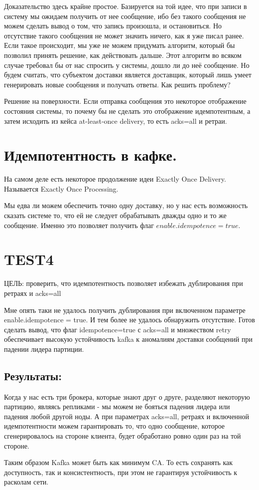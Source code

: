 \documentclass[11pt]{article}
\begin{document}
    Доказательство здесь крайне простое. Базируется на той идее, что при записи в систему мы ожидаем получить от нее сообщение, ибо без такого сообщения не можем сделать вывод о том, что запись произошла, и остановиться. Но отсутствие такого сообщения не может значить ничего, как я уже писал ранее.
    Если такое происходит, мы уже не можем придумать алгоритм, который бы позволил принять решение, как действовать дальше. Этот алгоритм во всяком случае требовал бы от нас спросить у системы, дошло ли до неё сообщение. Но будем считать, что субъектом доставки является доставщик, который лишь умеет генерировать новые сообщения и получать ответы. Как решить проблему?

    Решение на поверхности. Если отправка сообщения это некоторое отображение состояния системы, то почему бы не сделать это отображение идемпотентным, а затем исходить из кейса at-least-once delivery, то есть acks=all и ретраи.

    \section{Идемпотентность в кафке.}
    На самом деле есть некоторое продолжение идеи Exactly Once Delivery. Называется Exactly Once Processing.

    Мы едва ли можем обеспечить точно одну доставку, но у нас есть возможность сказать системе то, что ей не следует обрабатывать дважды одно и то же сообщение. Именно это позволяет получить флаг $enable.idempotence = true$.
    \section{TEST4}
    ЦЕЛЬ: проверить, что идемпотентность позволяет избежать дублирования при ретраях и acks=all

    Мне опять таки не удалось получить дублирования при включенном параметре enable.idempotence = true. И тем более не удалось обнаружить отсутствие. Готов сделать вывод, что флаг idempotence=true с acks=all и множеством retry обеспечивает высокую устойчивость kafka к аномалиям доставки сообщений при падении лидера партиции.
    \subsection{Результаты:}
    Когда у нас есть три брокера, которые знают друг о друге, разделяют некоторую партицию, являясь репликами - мы можем не бояться падения лидера или падения любой другой ноды. А при параметрах acks=all, ретраях и включенной идемпотентности можем гарантировать то, что одно сообщение, которое сгенерировалось на стороне клиента, будет обработано ровно один раз на той стороне.

    Таким образом Kafka может быть как минимум CA. То есть сохранять как доступность, так и консистентность, при этом не гарантируя устойчивость к расколам сети.
\end{document}
